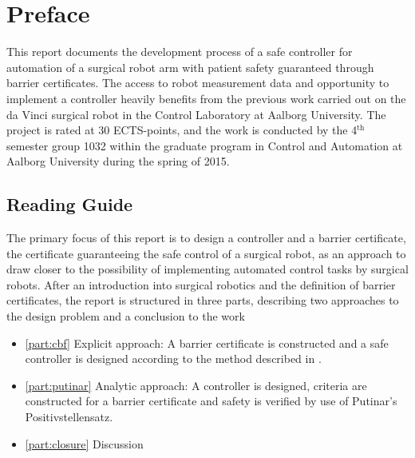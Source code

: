 \chapter*{Preface}
This report documents the development process of a safe controller for automation of a surgical robot arm with patient safety guaranteed through barrier certificates. %
The access to robot measurement data and opportunity to implement a controller heavily benefits from the previous work carried out on the da Vinci surgical robot in the Control Laboratory at Aalborg University.
The project is rated at 30 ECTS-points, and the work is conducted by the 4$^\text{th}$ semester group 1032 within the graduate program in Control and Automation at Aalborg University during the spring of 2015.




\section*{Reading Guide}
\vspace*{-2mm}
The primary focus of this report is to design a controller and a barrier certificate, the certificate guaranteeing the safe control of a surgical robot, as an approach to draw closer to the possibility of implementing automated control tasks by surgical robots. 
After an introduction into surgical robotics and the definition of barrier certificates, the report is structured in three parts, describing two approaches to the design problem and a conclusion to the work
\vspace*{-2mm}
\begin{itemize}
\itemsep-1.4mm
\item \autoref{part:cbf} Explicit approach: A barrier certificate is constructed and a safe controller is designed according to the method described in \citep{bib:org_control}.
\item \autoref{part:putinar} Analytic approach: A controller is designed, criteria are constructed for a barrier certificate and  safety is verified by use of Putinar's Positivstellensatz.
\item \autoref{part:closure} Discussion 
\end{itemize}

